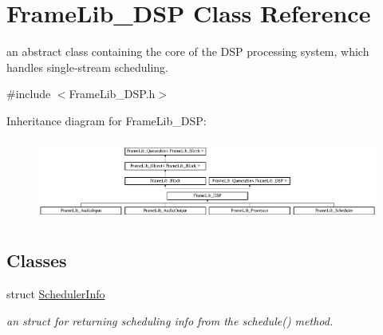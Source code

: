 \hypertarget{class_frame_lib___d_s_p}{}\section{Frame\+Lib\+\_\+\+D\+SP Class Reference}
\label{class_frame_lib___d_s_p}


an abstract class containing the core of the D\+SP processing system, which handles single-\/stream scheduling.  




{\ttfamily \#include $<$Frame\+Lib\+\_\+\+D\+S\+P.\+h$>$}

Inheritance diagram for Frame\+Lib\+\_\+\+D\+SP\+:\begin{figure}[H]
\begin{center}
\leavevmode
\includegraphics[height=2.723735cm]{class_frame_lib___d_s_p}
\end{center}
\end{figure}
\subsection*{Classes}
\begin{DoxyCompactItemize}
\item 
struct \hyperlink{struct_frame_lib___d_s_p_1_1_scheduler_info}{Scheduler\+Info}
\begin{DoxyCompactList}\small\item\em an struct for returning scheduling info from the schedule() method. \end{DoxyCompactList}\end{DoxyCompactItemize}
